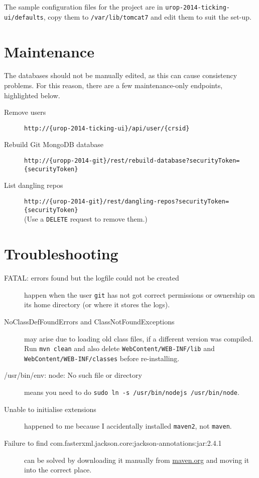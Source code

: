 \documentclass[12pt,a4paper]{article}
\newcommand{\tomcatwd}{{\tt /var/\hspace{0pt}lib/\hspace{0pt}tomcat7}}
\begin{document}
The sample configuration files for the project are in {\tt urop-2014-ticking-ui/defaults}, copy them to \tomcatwd{}{} and edit them to suit the set-up.

\section{Maintenance}
The databases should not be manually edited, as this can cause consistency problems.
For this reason, there are a few maintenance-only endpoints, highlighted below.
\begin{description}
  \item[Remove users] {\tt http://\{urop-2014-ticking-ui\}/\hspace{0pt}api/\hspace{0pt}user/\hspace{0pt}\{crsid\}}
  \item[Rebuild Git MongoDB database] {\tt http://\{uropp-2014-git\}/\hspace{0pt}rest/\hspace{0pt}rebuild-database?\hspace{0pt}securityToken=\hspace{0pt}\{securityToken\}}
  \item[List dangling repos] {\tt http://\{urop-2014-git\}/\hspace{0pt}rest/\hspace{0pt}dangling-repos?\hspace{0pt}securityToken=\hspace{0pt}\{securityToken\}}\\
    (Use a {\tt DELETE} request to remove them.)
\end{description}

\section{Troubleshooting}
\begin{description}
  \item[FATAL\@: errors found but the logfile could not be created] happen when the user {\tt git} has not got correct permissions or ownership on its home directory (or where it stores the logs).

  \item[NoClassDefFoundError{\rm s and} ClassNotFoundException{\rm s}] may arise due to loading old class files, if a different version was compiled. Run {\tt mvn clean} and also delete {\tt WebContent/WEB-INF/lib} and {\tt WebContent/WEB-INF/classes} before re-installing.
  \item[/usr/bin/env: node: No such file or directory] means you need to do {\tt sudo ln -s /usr/bin/nodejs /usr/bin/node}.

  \item[Unable to initialise extensions] happened to me because I accidentally installed {\tt maven2}, not {\tt maven}.

  \item[Failure to find com.fasterxml.jackson.core:jackson-annotations:jar:2.4.1] can be solved by downloading it manually from \url{maven.org} and moving it into  the correct place.

\end{description}
\end{document}
